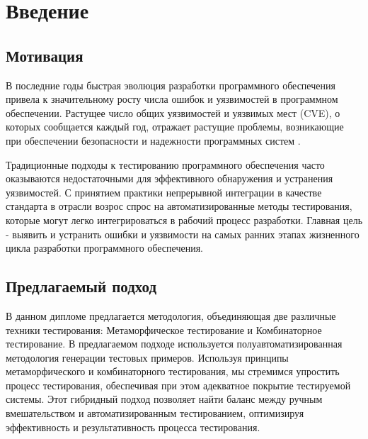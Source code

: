 \chapter{Введение}
\label{chap:intro}


\section{Мотивация}\label{sec:motivation}

В последние годы быстрая эволюция разработки программного обеспечения привела к значительному росту числа ошибок и уязвимостей в программном обеспечении.
Растущее число общих уязвимостей и уязвимых мест (CVE), о которых сообщается каждый год, отражает растущие проблемы, возникающие при обеспечении безопасности и надежности программных систем \cite{CVE}.

Традиционные подходы к тестированию программного обеспечения часто оказываются недостаточными для эффективного обнаружения и устранения уязвимостей.
С принятием практики непрерывной интеграции в качестве стандарта в отрасли возрос спрос на автоматизированные методы тестирования, которые могут легко интегрироваться в рабочий процесс разработки.
Главная цель - выявить и устранить ошибки и уязвимости на самых ранних этапах жизненного цикла разработки программного обеспечения.

\section{Предлагаемый подход}\label{sec:proposed-approach}

В данном дипломе предлагается методология, объединяющая две различные техники тестирования: Метаморфическое тестирование и Комбинаторное тестирование.
В предлагаемом подходе используется полуавтоматизированная методология генерации тестовых примеров.
Используя принципы метаморфического и комбинаторного тестирования, мы стремимся упростить процесс тестирования, обеспечивая при этом адекватное покрытие тестируемой системы.
Этот гибридный подход позволяет найти баланс между ручным вмешательством и автоматизированным тестированием, оптимизируя эффективность и результативность процесса тестирования.
